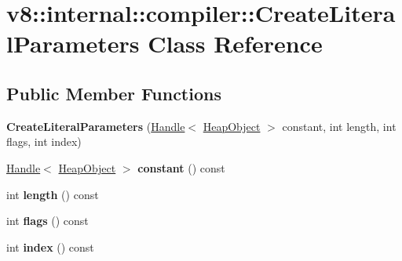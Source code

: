 \hypertarget{classv8_1_1internal_1_1compiler_1_1_create_literal_parameters}{}\section{v8\+:\+:internal\+:\+:compiler\+:\+:Create\+Literal\+Parameters Class Reference}
\label{classv8_1_1internal_1_1compiler_1_1_create_literal_parameters}
\subsection*{Public Member Functions}
\begin{DoxyCompactItemize}
\item 
{\bfseries Create\+Literal\+Parameters} (\hyperlink{classv8_1_1internal_1_1_handle}{Handle}$<$ \hyperlink{classv8_1_1internal_1_1_heap_object}{Heap\+Object} $>$ constant, int length, int flags, int index)\hypertarget{classv8_1_1internal_1_1compiler_1_1_create_literal_parameters_a4083e1d44bc77e9be61339397752696c}{}\label{classv8_1_1internal_1_1compiler_1_1_create_literal_parameters_a4083e1d44bc77e9be61339397752696c}

\item 
\hyperlink{classv8_1_1internal_1_1_handle}{Handle}$<$ \hyperlink{classv8_1_1internal_1_1_heap_object}{Heap\+Object} $>$ {\bfseries constant} () const \hypertarget{classv8_1_1internal_1_1compiler_1_1_create_literal_parameters_aed28f02e6094a2bd31d457f49257f01a}{}\label{classv8_1_1internal_1_1compiler_1_1_create_literal_parameters_aed28f02e6094a2bd31d457f49257f01a}

\item 
int {\bfseries length} () const \hypertarget{classv8_1_1internal_1_1compiler_1_1_create_literal_parameters_a51342b01155a938575633796cfdd44d2}{}\label{classv8_1_1internal_1_1compiler_1_1_create_literal_parameters_a51342b01155a938575633796cfdd44d2}

\item 
int {\bfseries flags} () const \hypertarget{classv8_1_1internal_1_1compiler_1_1_create_literal_parameters_a879cc1ffa8d2d9c451dee10ea58bcdbd}{}\label{classv8_1_1internal_1_1compiler_1_1_create_literal_parameters_a879cc1ffa8d2d9c451dee10ea58bcdbd}

\item 
int {\bfseries index} () const \hypertarget{classv8_1_1internal_1_1compiler_1_1_create_literal_parameters_aaf9dd815f7dca1c91b4a1c26320abfed}{}\label{classv8_1_1internal_1_1compiler_1_1_create_literal_parameters_aaf9dd815f7dca1c91b4a1c26320abfed}

\end{DoxyCompactItemize}

